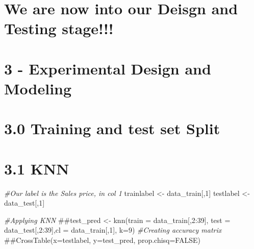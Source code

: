 \documentclass[]{article}
\newenvironment{Shaded}{\begin{snugshade}}{\end{snugshade}}
\newcommand{\KeywordTok}[1]{\textcolor[rgb]{0.13,0.29,0.53}{\textbf{#1}}}
\newcommand{\DecValTok}[1]{\textcolor[rgb]{0.00,0.00,0.81}{#1}}
\newcommand{\FloatTok}[1]{\textcolor[rgb]{0.00,0.00,0.81}{#1}}
\newcommand{\StringTok}[1]{\textcolor[rgb]{0.31,0.60,0.02}{#1}}
\newcommand{\CommentTok}[1]{\textcolor[rgb]{0.56,0.35,0.01}{\textit{#1}}}
\newcommand{\OperatorTok}[1]{\textcolor[rgb]{0.81,0.36,0.00}{\textbf{#1}}}
\newcommand{\NormalTok}[1]{#1}
\begin{document}
\section{We are now into our Deisgn and Testing
stage!!!}\label{we-are-now-into-our-deisgn-and-testing-stage}

\section{3 - Experimental Design and
Modeling}\label{experimental-design-and-modeling}

\section{3.0 Training and test set
Split}\label{training-and-test-set-split}

\begin{Shaded}
\end{Shaded}

\section{3.1 KNN}\label{knn}

\begin{Shaded}
\begin{Highlighting}[]
\CommentTok{#Our label is the Sales price, in col 1}
\NormalTok{trainlabel <-}\StringTok{ }\NormalTok{data_train[,}\DecValTok{1}\NormalTok{]}
\NormalTok{testlabel <-}\StringTok{ }\NormalTok{data_test[,}\DecValTok{1}\NormalTok{]}

\CommentTok{#Applying KNN}
\NormalTok{##test_pred <- knn(train = data_train[,2:39], test = data_test[,2:39],cl = data_train[,1], k=9)}
\CommentTok{#Creating accuracy matrix}
\NormalTok{##CrossTable(x=testlabel, y=test_pred, prop.chisq=FALSE)}
\end{Highlighting}
\end{Shaded}
\end{document}
